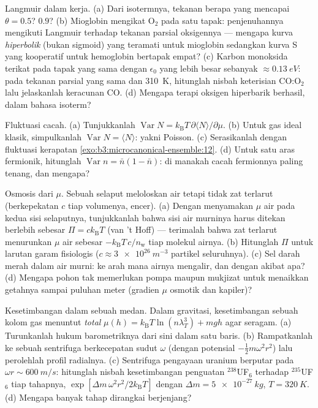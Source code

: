 \begin{exercise}[$\star\star$]\label{exo:b3:grand-canonical:6}
Langmuir dalam kerja. (a) Dari isotermnya, tekanan berapa yang mencapai
$\theta = 0.5$? $0.9$? (b) Mioglobin mengikat O$_2$ pada satu tapak:
penjenuhannya mengikuti Langmuir terhadap tekanan parsial oksigennya ---
mengapa kurva \emph{hiperbolik} (bukan sigmoid) yang teramati untuk
mioglobin sedangkan kurva S yang kooperatif untuk hemoglobin bertapak
empat? (c) Karbon monoksida terikat pada tapak yang sama dengan
$\epsilon_0$ yang lebih besar sebanyak $\approx\qty{0.13}{eV}$: pada
tekanan parsial yang sama dan \qty{310}{K}, hitunglah nisbah
keterisian CO:O$_2$ lalu jelaskanlah keracunan CO. (d) Mengapa terapi
oksigen hiperbarik berhasil, dalam bahasa isoterm?
\end{exercise}

\begin{exercise}[$\star\star$]\label{exo:b3:grand-canonical:7}
Fluktuasi cacah. (a) Tunjukkanlah $\operatorname{Var}N =
k_{\text{B}}T\,\partial\langle N\rangle/\partial\mu$. (b) Untuk gas
ideal klasik, simpulkanlah $\operatorname{Var}N = \langle
N\rangle$: yakni Poisson. (c) Serasikanlah dengan fluktuasi kerapatan
\cref{exo:b3:microcanonical-ensemble:12}. (d) Untuk satu aras
fermionik, hitunglah $\operatorname{Var}n = \bar n(1 - \bar
n)$: di manakah cacah fermionnya paling tenang, dan mengapa?
\end{exercise}

\begin{exercise}[$\star\star$]\label{exo:b3:grand-canonical:8}
Osmosis dari $\mu$. Sebuah selaput meloloskan air tetapi tidak zat
terlarut (berkepekatan $c$ tiap volumenya, encer). (a) Dengan
menyamakan $\mu$ air pada kedua sisi selaputnya, tunjukkanlah bahwa sisi
air murninya harus ditekan berlebih sebesar $\Pi = ck_{\text{B}}T$ (van
't Hoff) --- terimalah bahwa zat terlarut menurunkan $\mu$ air sebesar
$-k_{\text{B}}T\,c/n_{\text{w}}$ tiap molekul airnya. (b) Hitunglah
$\Pi$ untuk larutan garam fisiologis ($c \approx \qty{3e26}{m^{-3}}$
partikel seluruhnya). (c) Sel darah merah dalam air murni: ke arah mana
airnya mengalir, dan dengan akibat apa? (d) Mengapa pohon tak memerlukan
pompa maupun mukjizat untuk menaikkan getahnya sampai puluhan meter
(gradien $\mu$ osmotik dan kapiler)?
\end{exercise}

\begin{exercise}[$\star\star$]\label{exo:b3:grand-canonical:9}
Kesetimbangan dalam sebuah medan. Dalam gravitasi, kesetimbangan sebuah
kolom gas menuntut  \emph{total} $\mu(h) =
k_{\text{B}}T\ln(n\lambda_T^3) + mgh$ agar seragam. (a) Turunkanlah
hukum barometriknya dari sini dalam satu baris. (b) Rampatkanlah ke
sebuah sentrifuga berkecepatan sudut $\omega$ (dengan potensial
$-\tfrac12 m\omega^2r^2$) lalu perolehlah profil radialnya. (c)
Sentrifuga pengayaan uranium berputar pada $\omega r \sim
\qty{600}{m/s}$: hitunglah nisbah kesetimbangan penguatan $^{238}$UF$_6$
terhadap $^{235}$UF$_6$ tiap tahapnya, $\exp[\Delta m\,\omega^2
r^2/2k_{\text{B}}T]$ dengan $\Delta m = \qty{5e-27}{kg}$, $T =
\qty{320}{K}$. (d) Mengapa banyak tahap dirangkai berjenjang?
\end{exercise}


